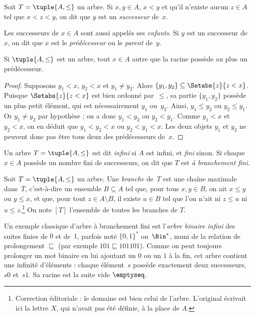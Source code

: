 \documentclass[11pt,a4paper,openany]{memoir}
\begin{document}
\begin{defn}[Successeurs]
Soit $T = \tuple{A, \le}$ un arbre. Si $x,y \in A$, $x < y$ et
qu’il n’existe aucun $z \in A$ tel que $x < z < y$, on dit que $y$
est un \emph{successeur} de~$x$.
\end{defn}

Les successeurs de $x \in A$ sont aussi appelés ses \emph{enfants}.
Si $y$ est un successeur de~$x$, on dit que $x$ est le \emph{prédécesseur}
ou le \emph{parent} de~$y$.

\begin{prop}
Si $\tuple{A,\le}$ est un arbre, tout $x \in A$ autre que la racine
possède au plus un prédécesseur.
\end{prop}

\begin{proof}
Supposons $y_1 < x$, $y_2 < x$ et $y_1 \neq y_2$.
Alors $\{y_1, y_2\} \subseteq \Setabs{z}{z<x}$.
Puisque $\Setabs{z}{z<x}$ est bien ordonné par~$\le$, sa partie
$\{y_1, y_2\}$ possède un plus petit élément, qui est nécessairement
$y_1$ ou~$y_2$. Ainsi, $y_1 \le y_2$ ou $y_2 \le y_1$.
Or $y_1 \neq y_2$ par hypothèse ; on a donc $y_1 < y_2$ ou $y_2 < y_1$.
Comme $y_1 < x$ et $y_2 < x$, on en déduit que $y_1 < y_2 < x$
ou $y_2 < y_1 < x$. Les deux objets $y_1$ et $y_2$ ne peuvent donc
pas être tous deux des prédécesseurs de~$x$.
\end{proof}

\begin{defn}
Un arbre $T = \tuple{A, \le}$ est dit \emph{infini} si $A$ est infini,
et \emph{fini} sinon. Si chaque $x \in A$ possède un nombre fini
de successeurs, on dit que $T$ est \emph{à branchement fini}.
\end{defn}

\begin{defn}[Branches]
Soit $T = \tuple{A, \le}$ un arbre. Une \emph{branche} de~$T$ est une
chaîne maximale dans~$T$, c’est-à-dire un ensemble $B \subseteq A$
tel que, pour tous $x, y \in B$, on ait $x \le y$ ou $y \le x$,
et que, pour tout $z \in A \setminus B$, il existe $u \in B$ tel que
l’on n’ait ni $z \le u$ ni $u \le z$.\footnote{Correction éditoriale :
le domaine est bien celui de l’arbre. L’original écrivait ici la lettre
$X$, qui n’avait pas été définie, à la place de $A$.}
%
On note $[T]$ l’ensemble de toutes les branches de $T$.
\end{defn}

\begin{ex}
Un exemple classique d’arbre à branchement fini est l’\emph{arbre binaire
infini} des suites finies de $0$ et de~$1$, parfois noté $\{0,1\}^*$
ou~$\Bin^*$, muni de la relation de prolongement $\sqsubseteq$
(par exemple $101 \sqsubseteq 101101$). Comme on peut toujours prolonger
un mot binaire en lui ajoutant un $0$ ou un $1$ à la fin, cet arbre
contient une infinité d’éléments : chaque élément~$s$ possède exactement
deux successeurs, $s0$ et~$s1$. Sa racine est la suite vide $\emptyseq$.
\end{ex}
\end{document}
